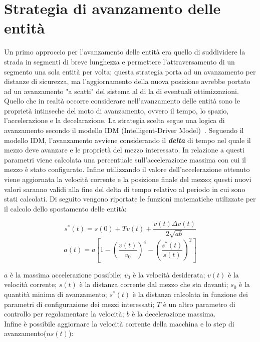 \section{Strategia di avanzamento delle entità}
Un primo approccio per l'avanzamento delle entità era quello di suddividere la strada in segmenti di breve lunghezza e permettere l'attraversamento di un segmento una sola entità per volta; questa strategia porta ad un avanzamento per distanze di sicurezza, ma l'aggiornamento della nuova posizione avrebbe portato ad un avanzamento "a scatti" del sistema al di la di eventuali ottimizzazioni. \\
Quello che in realtà occorre considerare nell'avanzamento delle entità sono le
proprietà intinseche del moto di avanzamento, ovvero il tempo, lo spazio,
l'accelerazione  e la decelarazione. La strategia scelta segue una logica di
avanzamento secondo il modello IDM (Intelligent-Driver
Model)~\cite{treiber2000microscopic}.
Seguendo il modello IDM, l'avanzamento avviene considerando il \textbf{\textit{delta}} di tempo nel quale il mezzo deve avanzare e le proprietà del mezzo interessato. In relazione a questi parametri viene calcolata una percentuale sull'accelerazione massima con cui il mezzo è stato configurato. Infine utilizzando il valore dell'accelerazione ottenuto viene aggiornata la velocità corrente e la posizione finale del mezzo; questi nuovi valori saranno validi alla fine del delta di tempo relativo al periodo in cui sono stati calcolati. Di seguito vengono riportate le funzioni matematiche utilizzate per il calcolo dello spostamento delle entità:

\begin{equation}
s^{*}(t)=s(0)+Tv(t)+\frac{v(t)\Delta{v(t)}}{2\sqrt{ab}}
\end{equation}
\begin{equation}
a(t)=a[1-(\frac{v(t)}{v_{0}})^4-(\frac{s^{*}(t)}{s(t)})^2]
\end{equation}

$a$ è la massima accelerazione possibile; $v_{0}$ è la velocità desiderata; $v(t)$ è la velocità corrente; $s(t)$ è la distanza corrente dal mezzo che sta davanti; $s_{0}$ è la quantità minima di avanzamento; $s^*(t)$ è la distanza calcolata in funzione dei parametri di configurazione dei mezzi interessati; $T$ è un altro parametro di controllo per regolamentare la velocità; $b$ è la decelerazione massima.\\
Infine è possibile aggiornare la velocità corrente della macchina e lo step di avanzamento($ns(t)$): \\

